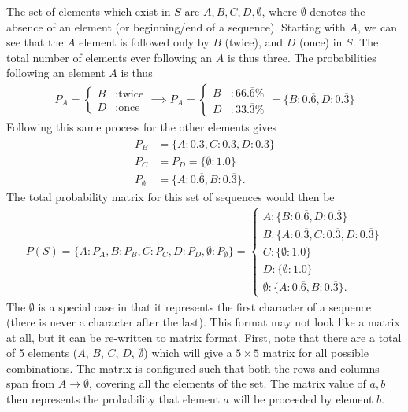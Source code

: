 The set of elements which exist in $S$ are ${A, B, C, D, \emptyset}$, where $\emptyset$ denotes the absence of an element (or beginning/end of a sequence). Starting with $A$, we can see that the $A$ element is followed only by $B$ (twice), and $D$ (once) in $S$. The total number of elements ever following an $A$ is thus three. The probabilities following an element $A$ is thus
\begin{align}
P_A = \begin{cases}
  B & :\text{twice} \\
  D & :\text{once}
\end{cases} \implies P_A = \begin{cases}
  B & : 66.\overline{6}\% \\
  D & : 33.\overline{3}\%
\end{cases} = \{B:0.\overline{6}, D:0.\overline{3}\}
\end{align}
Following this same process for the other elements gives
\begin{align}
P_B &= \{A:0.\overline{3}, C:0.\overline{3}, D:0.\overline{3}\} \\ 
P_C &= P_D = \{\emptyset:1.0\}\\ 
P_\emptyset &= \{A:0.\overline{6}, B:0.\overline{3}\}.  
\end{align}
The total probability matrix for this set of sequences would then be
\begin{align}
P(S) = \{A:P_A, B:P_B, C:P_C, D:P_D, \emptyset: P_\emptyset\} = \begin{cases}
A:\{B:0.\overline{6}, D:0.\overline{3}\} \\
B: \{A:0.\overline{3}, C:0.\overline{3}, D:0.\overline{3}\} \\
C: \{\emptyset:1.0\} \\
D: \{\emptyset:1.0\} \\
\emptyset: \{A:0.\overline{6}, B:0.\overline{3}\}.
\end{cases}
\end{align}
The $\emptyset$ is a special case in that it represents the first character of a sequence (there is never a character after the last). This format may not look like a matrix at all, but it can be re-written to matrix format. First, note that there are a total of 5 elements ($A$, $B$, $C$, $D$, $\emptyset$) which will give a $5 \times 5$ matrix for all possible combinations. The matrix is configured such that both the rows and columns span from $A\rightarrow\emptyset$, covering all the elements of the set. The matrix value of $a, b$ then represents the probability that element $a$ will be proceeded by element $b$.
